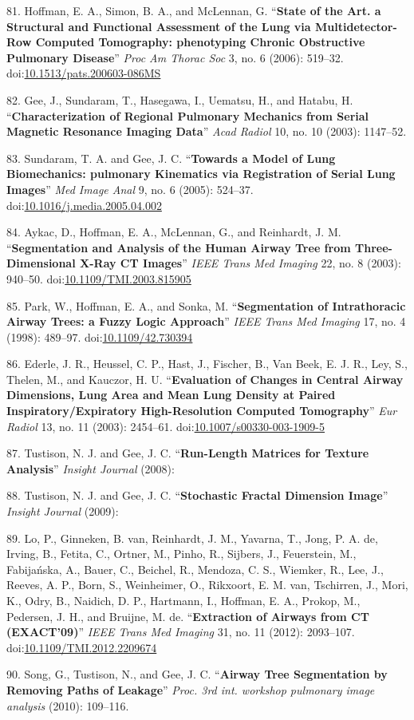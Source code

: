 \documentclass[11pt,]{article}
\begin{document}
81. Hoffman, E. A., Simon, B. A., and McLennan, G. ``\textbf{State of
the Art. a Structural and Functional Assessment of the Lung via
Multidetector-Row Computed Tomography: phenotyping Chronic Obstructive
Pulmonary Disease}'' \emph{Proc Am Thorac Soc} 3, no. 6 (2006): 519--32.
doi:\href{http://dx.doi.org/10.1513/pats.200603-086MS}{10.1513/pats.200603-086MS}

82. Gee, J., Sundaram, T., Hasegawa, I., Uematsu, H., and Hatabu, H.
``\textbf{Characterization of Regional Pulmonary Mechanics from Serial
Magnetic Resonance Imaging Data}'' \emph{Acad Radiol} 10, no. 10 (2003):
1147--52.

83. Sundaram, T. A. and Gee, J. C. ``\textbf{Towards a Model of Lung
Biomechanics: pulmonary Kinematics via Registration of Serial Lung
Images}'' \emph{Med Image Anal} 9, no. 6 (2005): 524--37.
doi:\href{http://dx.doi.org/10.1016/j.media.2005.04.002}{10.1016/j.media.2005.04.002}

84. Aykac, D., Hoffman, E. A., McLennan, G., and Reinhardt, J. M.
``\textbf{Segmentation and Analysis of the Human Airway Tree from
Three-Dimensional X-Ray CT Images}'' \emph{IEEE Trans Med Imaging} 22,
no. 8 (2003): 940--50.
doi:\href{http://dx.doi.org/10.1109/TMI.2003.815905}{10.1109/TMI.2003.815905}

85. Park, W., Hoffman, E. A., and Sonka, M. ``\textbf{Segmentation of
Intrathoracic Airway Trees: a Fuzzy Logic Approach}'' \emph{IEEE Trans
Med Imaging} 17, no. 4 (1998): 489--97.
doi:\href{http://dx.doi.org/10.1109/42.730394}{10.1109/42.730394}

86. Ederle, J. R., Heussel, C. P., Hast, J., Fischer, B., Van Beek, E.
J. R., Ley, S., Thelen, M., and Kauczor, H. U. ``\textbf{Evaluation of
Changes in Central Airway Dimensions, Lung Area and Mean Lung Density at
Paired Inspiratory/Expiratory High-Resolution Computed Tomography}''
\emph{Eur Radiol} 13, no. 11 (2003): 2454--61.
doi:\href{http://dx.doi.org/10.1007/s00330-003-1909-5}{10.1007/s00330-003-1909-5}

87. Tustison, N. J. and Gee, J. C. ``\textbf{Run-Length Matrices for
Texture Analysis}'' \emph{Insight Journal} (2008):

88. Tustison, N. J. and Gee, J. C. ``\textbf{Stochastic Fractal
Dimension Image}'' \emph{Insight Journal} (2009):

89. Lo, P., Ginneken, B. van, Reinhardt, J. M., Yavarna, T., Jong, P. A.
de, Irving, B., Fetita, C., Ortner, M., Pinho, R., Sijbers, J.,
Feuerstein, M., Fabija{ń}ska, A., Bauer, C., Beichel, R., Mendoza, C.
S., Wiemker, R., Lee, J., Reeves, A. P., Born, S., Weinheimer, O.,
Rikxoort, E. M. van, Tschirren, J., Mori, K., Odry, B., Naidich, D. P.,
Hartmann, I., Hoffman, E. A., Prokop, M., Pedersen, J. H., and Bruijne,
M. de. ``\textbf{Extraction of Airways from CT (EXACT'09)}'' \emph{IEEE
Trans Med Imaging} 31, no. 11 (2012): 2093--107.
doi:\href{http://dx.doi.org/10.1109/TMI.2012.2209674}{10.1109/TMI.2012.2209674}

90. Song, G., Tustison, N., and Gee, J. C. ``\textbf{Airway Tree
Segmentation by Removing Paths of Leakage}'' \emph{Proc. 3rd int.
workshop pulmonary image analysis} (2010): 109--116.
\end{document}
